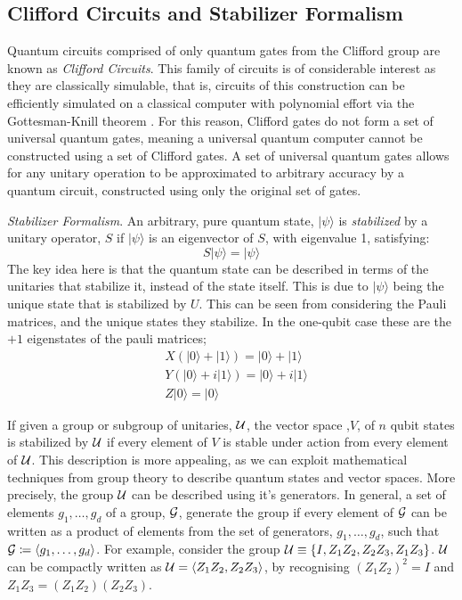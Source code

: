 \subsection{Clifford Circuits and Stabilizer Formalism}

Quantum circuits comprised of only quantum gates from the Clifford group are known as \textit{Clifford Circuits}.
This family of circuits is of considerable interest as they are classically simulable, that is,
circuits of this construction can be efficiently simulated on a classical computer with polynomial
effort via the Gottesman-Knill theorem \cite{knillGottesman}. For this reason, Clifford gates do not form
a set of universal quantum gates, meaning a universal quantum computer cannot be constructed using a set
of Clifford gates. A set of universal quantum gates allows for any unitary operation to be approximated to
arbitrary accuracy by a quantum circuit, constructed using only the original set of gates.

\textit{Stabilizer Formalism}. An arbitrary, pure quantum state, $|\psi\rangle$ is \textit{stabilized} by
a unitary operator, $S$ if $|\psi\rangle$  is an eigenvector of $S$, with eigenvalue 1, satisfying:
\begin{equation}
    S|\psi\rangle = |\psi\rangle
\end{equation}
The key idea here is that the quantum state can be described in terms of the unitaries that stabilize it, instead of the state itself.
This is due to $|\psi\rangle$ being the unique state that is stabilized by $U$. \cite{PhysRevA.70.052328}
This can be seen from considering the Pauli matrices, and the unique states they stabilize. In the one-qubit case these are
the $+1$ eigenstates of the pauli matrices;
\begin{align}
     & X(|0\rangle + |1\rangle) = |0\rangle + |1\rangle   \\
     & Y(|0\rangle + i|1\rangle) = |0\rangle + i|1\rangle \\
     & Z|0\rangle = |0\rangle
\end{align}

If given a group or subgroup of unitaries, $\cal U$, the vector space ,$V$, of $n$ qubit states is
stabilized by $\cal U$ if every element of $V$ is stable under action from every element of $\cal U$.
This description is more appealing, as we can exploit mathematical techniques from group theory to
describe quantum states and vector spaces. More precisely, the group $\cal U$ can be described using it's
generators. In general, a set of elements  $g_1, \dots, g_d$ of a group, $\cal G$, generate the group
if every element of $\cal G$ can be written as a product of elements from the set of generators,
$g_1, \dots, g_d$, such that ${\cal G} \coloneqq \langle g_1, \dots, g_d\rangle$. For example,
consider the group ${\cal U} \equiv \{ I, Z_1Z_2, Z_2Z_3, Z_1Z_3\}$. ${\cal U}$ can be compactly written
as ${\cal U} = \langle Z_1Z_2, Z_2Z_3 \rangle$, by recognising $(Z_1Z_2)^2 = I$ and
$Z_1Z_3 = (Z_1Z_2)(Z_2Z_3)$.

